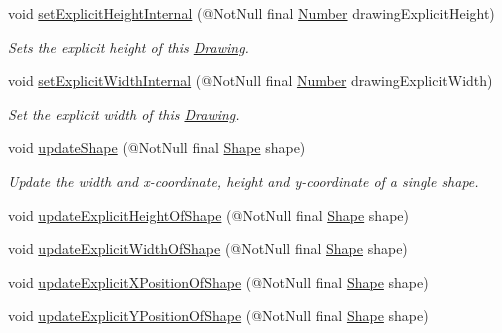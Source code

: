 \begin{DoxyCompactItemize}
void \hyperlink{classcom_1_1aarrelaakso_1_1drawl_1_1_drawing_a54f9447ef03b883cac2bf4535e777a7a}{set\+Explicit\+Height\+Internal} (@Not\+Null final \hyperlink{interfacecom_1_1aarrelaakso_1_1drawl_1_1_number}{Number} drawing\+Explicit\+Height)
\begin{DoxyCompactList}\small\item\em Sets the explicit height of this \hyperlink{classcom_1_1aarrelaakso_1_1drawl_1_1_drawing}{Drawing}. \end{DoxyCompactList}\item 
void \hyperlink{classcom_1_1aarrelaakso_1_1drawl_1_1_drawing_a7083d7046d42a99050495007854b5908}{set\+Explicit\+Width\+Internal} (@Not\+Null final \hyperlink{interfacecom_1_1aarrelaakso_1_1drawl_1_1_number}{Number} drawing\+Explicit\+Width)
\begin{DoxyCompactList}\small\item\em Set the explicit width of this \hyperlink{classcom_1_1aarrelaakso_1_1drawl_1_1_drawing}{Drawing}. \end{DoxyCompactList}\item 
void \hyperlink{classcom_1_1aarrelaakso_1_1drawl_1_1_drawing_aa60d355859fa4dc21d2670aced9ee927}{update\+Shape} (@Not\+Null final \hyperlink{classcom_1_1aarrelaakso_1_1drawl_1_1_shape}{Shape} shape)
\begin{DoxyCompactList}\small\item\em Update the width and x-\/coordinate, height and y-\/coordinate of a single shape. \end{DoxyCompactList}\item 
void \hyperlink{classcom_1_1aarrelaakso_1_1drawl_1_1_drawing_ab55b53c2e069f28185865f5cf677c8cd}{update\+Explicit\+Height\+Of\+Shape} (@Not\+Null final \hyperlink{classcom_1_1aarrelaakso_1_1drawl_1_1_shape}{Shape} shape)
\item 
void \hyperlink{classcom_1_1aarrelaakso_1_1drawl_1_1_drawing_a5c146de66e8f3272b57322f1cee7d7d6}{update\+Explicit\+Width\+Of\+Shape} (@Not\+Null final \hyperlink{classcom_1_1aarrelaakso_1_1drawl_1_1_shape}{Shape} shape)
\item 
void \hyperlink{classcom_1_1aarrelaakso_1_1drawl_1_1_drawing_a9ae55cefe8729385c2a9cb8b9aff6763}{update\+Explicit\+X\+Position\+Of\+Shape} (@Not\+Null final \hyperlink{classcom_1_1aarrelaakso_1_1drawl_1_1_shape}{Shape} shape)
\item 
void \hyperlink{classcom_1_1aarrelaakso_1_1drawl_1_1_drawing_a52d5971daf6f95d27bcdf7650d0a9e37}{update\+Explicit\+Y\+Position\+Of\+Shape} (@Not\+Null final \hyperlink{classcom_1_1aarrelaakso_1_1drawl_1_1_shape}{Shape} shape)
\end{DoxyCompactItemize}
